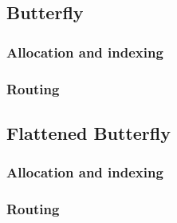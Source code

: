 
\subsection{Butterfly}
\label{subsec:tutorial:butterfly}

\subsubsection{Allocation and indexing}
\label{subsubsec:tutorial:butterflyAllocation}

\subsubsection{Routing}

\subsection{Flattened Butterfly}
\label{subsec:tutorial:fbfly}

\subsubsection{Allocation and indexing}

\subsubsection{Routing}
